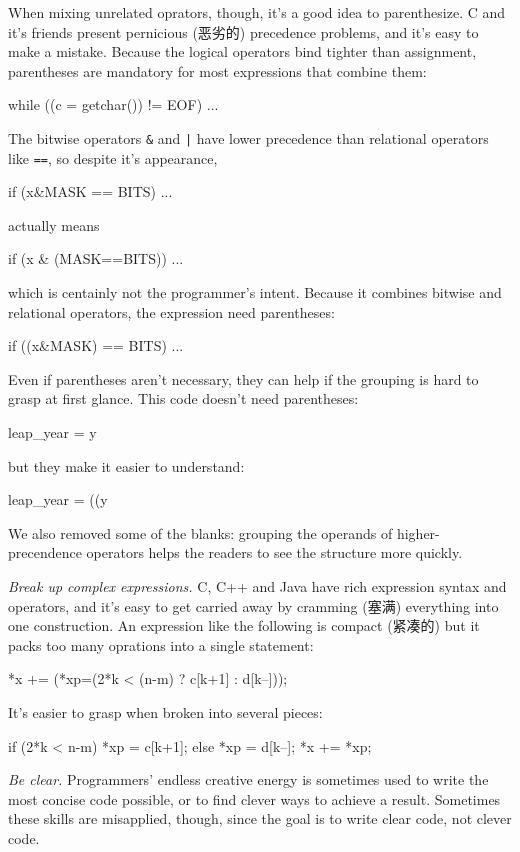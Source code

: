 When mixing unrelated oprators, though, it's a good idea to parenthesize. C
and it's friends present pernicious (恶劣的) precedence problems, and it's
easy to make a mistake. Because the logical operators bind tighter than
assignment, parentheses are mandatory for most expressions that combine them:
\begin{wellcode}
    while ((c = getchar()) != EOF)
        ...
\end{wellcode}
The bitwise operators \verb"&" and \verb"|" have lower precedence than
relational operators like \verb"==", so despite it's appearance,
\begin{badcode}
    if (x&MASK == BITS)
        ...
\end{badcode}
actually means
\begin{badcode}
    if (x & (MASK==BITS))
        ...
\end{badcode}
which is centainly not the programmer's intent. Because it combines bitwise
and relational operators, the expression need parentheses:
\begin{wellcode}
    if ((x&MASK) == BITS)
        ...
\end{wellcode}
Even if parentheses aren't necessary, they can help if the grouping is hard
to grasp at first glance. This code doesn't need parentheses:
\begin{badcode}
    leap_year = y %
\end{badcode}
but they make it easier to understand:
\begin{wellcode}
    leap_year = ((y%
\end{wellcode}
We also removed some of the blanks: grouping the operands of
higher-precendence operators helps the readers to see the structure more
quickly.

\emph{Break up complex expressions.} C, C++ and Java have rich expression
syntax and operators, and it's easy to get carried away by cramming (塞满)
everything into one construction. An expression like the following is
compact (紧凑的) but it packs too many oprations into a single statement:
\begin{badcode}
    *x += (*xp=(2*k < (n-m) ? c[k+1] : d[k--]));
\end{badcode}
It's easier to grasp when broken into several pieces:
\begin{wellcode}
    if (2*k < n-m)
        *xp = c[k+1];
    else 
        *xp = d[k--];
    *x += *xp;
\end{wellcode}
\emph{Be clear.} Programmers' endless creative energy is sometimes used to
write the most concise code possible, or to find clever ways to achieve a
result. Sometimes these skills are misapplied, though, since the goal is to
write clear code, not clever code.

